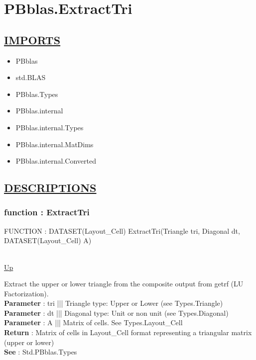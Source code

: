 \chapter*{PBblas.ExtractTri}
\hypertarget{PBblas.ExtractTri}{}

\section*{\underline{IMPORTS}}
\begin{itemize}
\item PBblas
\item std.BLAS
\item PBblas.Types
\item PBblas.internal
\item PBblas.internal.Types
\item PBblas.internal.MatDims
\item PBblas.internal.Converted
\end{itemize}

\section*{\underline{DESCRIPTIONS}}
\subsection*{function : ExtractTri}
\hypertarget{ecldoc:pbblas.extracttri}{FUNCTION : DATASET(Layout\_Cell) ExtractTri(Triangle tri, Diagonal dt, DATASET(Layout\_Cell) A)} \\
\hyperlink{ecldoc:}{Up} \\
\par
Extract the upper or lower triangle from the composite output from getrf (LU Factorization). \\
\textbf{Parameter} : tri ||| Triangle type: Upper or Lower (see Types.Triangle) \\
\textbf{Parameter} : dt ||| Diagonal type: Unit or non unit (see Types.Diagonal) \\
\textbf{Parameter} : A ||| Matrix of cells. See Types.Layout\_Cell \\
\textbf{Return} : Matrix of cells in Layout\_Cell format representing a triangular matrix (upper or lower) \\
\textbf{See} : Std.PBblas.Types \\
